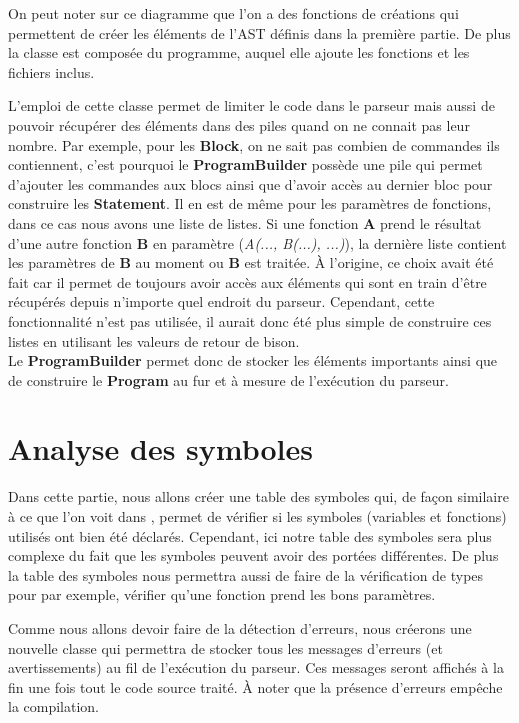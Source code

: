 \documentclass[a4paper]{article}%
\begin{document}
On peut noter sur ce diagramme que l'on a des fonctions de créations qui
permettent de créer les éléments de l'AST définis dans la première partie. De
plus la classe est composée du programme, auquel elle ajoute les fonctions et les
fichiers inclus. %

L'emploi de cette classe permet de limiter le code dans le parseur mais aussi de
pouvoir récupérer des éléments dans des piles quand on ne connait pas leur
nombre. Par exemple, pour les \textbf{Block}, on ne sait pas combien de
commandes ils contiennent, c'est pourquoi le \textbf{ProgramBuilder} possède une
pile qui permet d'ajouter les commandes aux blocs ainsi que d'avoir accès au
dernier bloc pour construire les \textbf{Statement}. Il en est de même pour
les paramètres de fonctions, dans ce cas nous avons une liste de listes. Si une
fonction \textbf{A} prend le résultat d'une autre fonction \textbf{B} en
paramètre (\textit{A(..., B(...), ...)}), la dernière liste contient les
paramètres de \textbf{B} au moment ou \textbf{B} est traitée. À l'origine, ce
choix avait été fait car il permet de toujours avoir accès aux éléments qui sont
en train d'être récupérés depuis n'importe quel endroit du parseur. Cependant,
cette fonctionnalité n'est pas utilisée, il aurait donc été plus simple de
construire ces listes en utilisant les valeurs de retour de bison.\\

Le \textbf{ProgramBuilder} permet donc de stocker les éléments importants ainsi
que de construire le \textbf{Program} au fur et à mesure de l'exécution du
parseur.


\section{Analyse des symboles}

Dans cette partie, nous allons créer une table des symboles qui, de façon
similaire à ce que l'on voit dans \cite{compilerFlexBison}, permet de vérifier
si les symboles (variables et fonctions) utilisés ont bien été déclarés.
Cependant, ici notre table des symboles sera plus complexe du fait que les
symboles peuvent avoir des portées différentes. De plus la table des symboles
nous permettra aussi de faire de la vérification de types pour par exemple,
vérifier qu'une fonction prend les bons paramètres.

Comme nous allons devoir faire de la détection d'erreurs, nous créerons une
nouvelle classe qui permettra de stocker tous les messages d'erreurs (et
avertissements) au fil de l'exécution du parseur. Ces messages seront affichés à
la fin une fois tout le code source traité. À noter que la présence d'erreurs
empêche la compilation.
\end{document}
